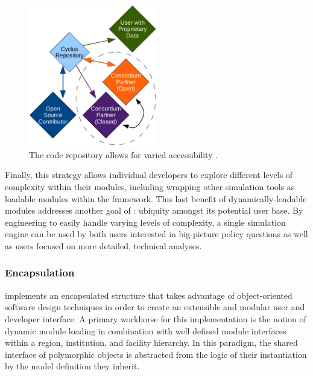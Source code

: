 \begin{figure}[htb!]
  \begin{center}
    \includegraphics[width=0.5\textwidth]{./chapters/paradigm/openness.eps}
  \end{center}
  \caption[Schematic of the \Cyclus code repository.]{The \Cyclus code repository allows for varied accessibility 
  \cite{wilson_cyclus:_2012}.}
  \label{fig:repo}
\end{figure}

Finally, this strategy allows individual developers to
explore different levels of complexity within their modules, including
wrapping other simulation tools as loadable modules within the \Cyclus 
framework. This last benefit of dynamically-loadable modules addresses 
another goal of \Cyclus: ubiquity amongst its potential user base. By
engineering \Cyclus to easily handle varying levels of complexity, a single
simulation engine can be used by both users interested in big-picture policy
questions as well as users focused on more detailed, technical
analyses.

\subsubsection{Encapsulation}

\Cyclus implements an encapsulated structure that takes advantage of 
object-oriented software design techniques in order to create an 
extensible and modular user and developer interface. A primary 
workhorse for this implementation is the notion of dynamic module 
loading in combination with  well defined module interfaces within 
a region, institution, and facility  hierarchy. In this paradigm, 
the shared interface of polymorphic objects is abstracted from the 
logic of their instantiation by the model definition they inherit.  

